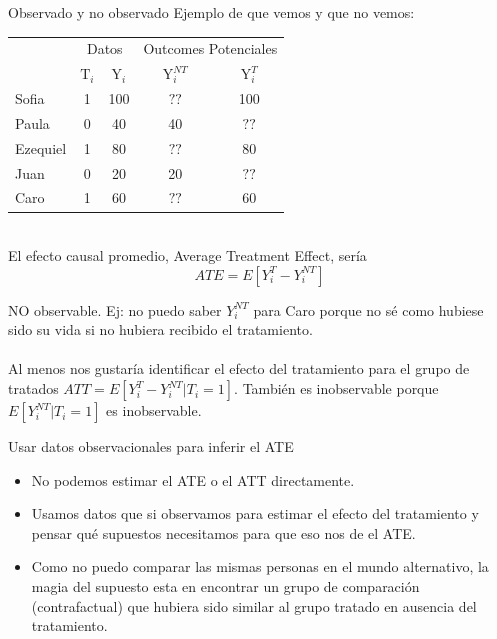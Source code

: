\documentclass[10pt]{beamer}
\begin{document}
\begin{frame}{Observado y no observado}
    Ejemplo de que vemos y que no vemos:
    \begin{tabular}{lcc|cc}
    \hline \hline  & \multicolumn{2}{c}{ Datos } & \multicolumn{2}{c}{ Outcomes Potenciales } \\
     & $\mathrm{T}_{i}$ & $\mathrm{Y}_{i}$ & $\mathrm{Y}_{i}^{N T}$ & $\mathrm{Y}_{i}^{T}$ \\
    \hline Sofia & 1 & 100 & $? ?$ & 100 \\
    Paula & 0 & 40 & 40 & $? ?$ \\
    Ezequiel & 1 & 80 & $? ?$ & 80 \\
    Juan & 0 & 20 & 20 & $? ?$ \\
    Caro & 1 & 60 & $? ?$ & 60 \\
    \hline \hline
    \end{tabular}\\
    El efecto causal promedio, Average Treatment Effect, sería
    \[ATE = E[Y_i^T - Y_i^{NT}]\]
    
    NO observable. Ej: no puedo saber $Y_i^{NT}$ para Caro porque no sé como hubiese sido su vida si no hubiera recibido el tratamiento.
    \\~\\
    Al menos nos gustaría identificar el efecto del tratamiento para el grupo de tratados $ATT = E[Y_i^T - Y_i^{NT}|T_i=1]$. También es inobservable porque $E[Y_i^{NT}|T_i=1]$ es inobservable. 
\end{frame}

\begin{frame}{Usar datos observacionales para inferir el ATE}
\begin{itemize}
    \item No podemos estimar el ATE o el ATT directamente.
    \item Usamos datos que si observamos para estimar el efecto del tratamiento y pensar qué supuestos necesitamos para que eso nos de el ATE.
    \item Como no puedo comparar las mismas personas en el mundo alternativo, la magia del supuesto esta en encontrar un grupo de comparación (contrafactual) que hubiera sido similar al grupo tratado en ausencia del tratamiento.
\end{itemize}  
\end{frame}
\end{document}
